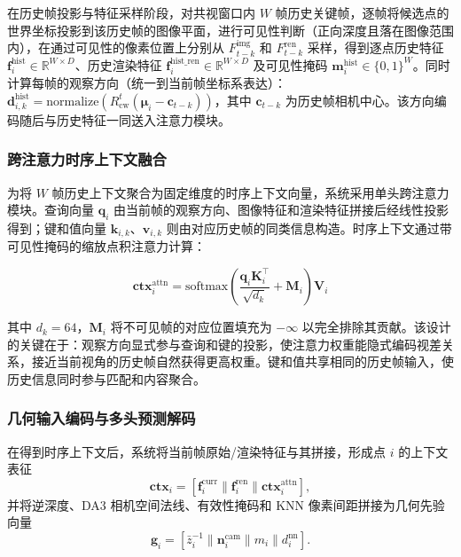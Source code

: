 在历史帧投影与特征采样阶段，对共视窗口内 $W$ 帧历史关键帧，逐帧将候选点的世界坐标投影到该历史帧的图像平面，进行可见性判断（正向深度且落在图像范围内），在通过可见性的像素位置上分别从 $F_{t-k}^{\text{img}}$ 和 $F_{t-k}^{\text{ren}}$ 采样，得到逐点历史特征 $\mathbf{f}_i^{\text{hist}} \in \mathbb{R}^{W \times D}$、历史渲染特征 $\mathbf{f}_i^{\text{hist\_ren}} \in \mathbb{R}^{W \times D}$ 及可见性掩码 $\mathbf{m}_i^{\text{hist}} \in \{0,1\}^{W}$。同时计算每帧的观察方向（统一到当前帧坐标系表达）：$\mathbf{d}_{i,k}^{\text{hist}} = \text{normalize}(R_{\text{cw}}^t (\boldsymbol{\mu}_i - \mathbf{c}_{t-k}))$，其中 $\mathbf{c}_{t-k}$ 为历史帧相机中心。该方向编码随后与历史特征一同送入注意力模块。

\subsubsection{跨注意力时序上下文融合}

为将 $W$ 帧历史上下文聚合为固定维度的时序上下文向量，系统采用单头跨注意力模块。查询向量 $\mathbf{q}_i$ 由当前帧的观察方向、图像特征和渲染特征拼接后经线性投影得到；键和值向量 $\mathbf{k}_{i,k}$、$\mathbf{v}_{i,k}$ 则由对应历史帧的同类信息构造。时序上下文通过带可见性掩码的缩放点积注意力计算：

\begin{equation}
\mathbf{ctx}_i^{\text{attn}} = \text{softmax}\!\left(\frac{\mathbf{q}_i \mathbf{K}_i^\top}{\sqrt{d_k}} + \mathbf{M}_i\right) \mathbf{V}_i
\end{equation}

其中 $d_k = 64$，$\mathbf{M}_i$ 将不可见帧的对应位置填充为 $-\infty$ 以完全排除其贡献。该设计的关键在于：观察方向显式参与查询和键的投影，使注意力权重能隐式编码视差关系，接近当前视角的历史帧自然获得更高权重。键和值共享相同的历史帧输入，使历史信息同时参与匹配和内容聚合。

\subsubsection{几何输入编码与多头预测解码}

在得到时序上下文后，系统将当前帧原始/渲染特征与其拼接，形成点 $i$ 的上下文表征
\begin{equation}
\mathbf{ctx}_i = [\mathbf{f}_i^{\text{curr}} \| \mathbf{f}_i^{\text{ren}} \| \mathbf{ctx}_i^{\text{attn}}],
\end{equation}
并将逆深度、DA3 相机空间法线、有效性掩码和 KNN 像素间距拼接为几何先验向量
\begin{equation}
\mathbf{g}_i = [\bar{z}_i^{-1} \| \mathbf{n}_i^{\text{cam}} \| m_i \| d_i^{\text{nn}}].
\end{equation}

